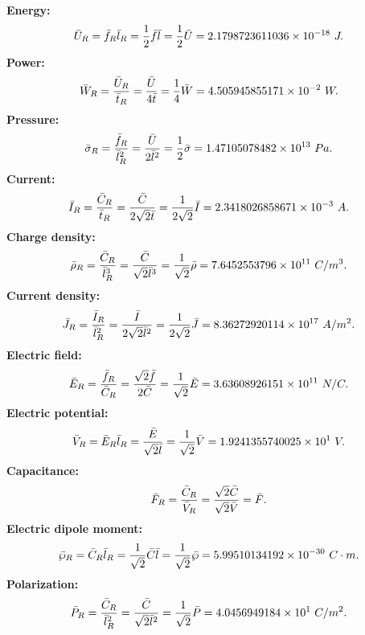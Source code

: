 \documentclass[12pt,a4paper]{article}
\def\barury{2.1798723611036\times 10^{-18}}
\def\barwry{4.505945855171\times 10^{-2}}
\def\barprry{1.47105078482\times 10^{13}}
\def\bariry{2.3418026858671\times 10^{-3}}
\def\barrhory{7.6452553796\times 10^{11}}
\def\barcurry{8.36272920114\times 10^{17}}
\def\barery{3.63608926151\times 10^{11}}
\def\barphiry{1.9241355740025\times 10^{1}}
\def\bardipry{5.99510134192\times 10^{-30}}
\def\barpolarry{4.0456949184\times 10^{1}}
\begin{document}
{{\bf Energy:}
\begin{equation}
\bar U_R={\bar f_R \bar l_R}= {1\over 2} \bar f \bar l
= {1\over 2} \bar U=\barury\ J.
\end{equation}
{\bf Power:}
\begin{equation}
\bar W_R={\bar U_R \over \bar t_R}= {\bar U \over 4 \bar t}
= {1\over 4} \bar W=\barwry\ W.
\end{equation}
{\bf Pressure:}
\begin{equation}
\bar \sigma_R={\bar f_R \over \bar l_R^2}= {\bar U \over 2 \bar l^2}
= {1\over 2} \bar \sigma=\barprry\ Pa.
\end{equation}
{\bf Current:}
\begin{equation}
\bar I_R={\bar C_R \over \bar t_R}= {\bar C \over 2 \sqrt{2} \bar t}
= {1\over 2 \sqrt{2}} \bar I=\bariry\ A.
\end{equation}
{\bf Charge density:}
\begin{equation}
\bar \rho_R={\bar C_R \over \bar l_R^3}= {\bar C \over \sqrt{2} \bar l^3}
= {1\over \sqrt{2}} \bar \rho=\barrhory\ C/m^3.
\end{equation}
{\bf Current density:}
\begin{equation}
\bar J_R={\bar I_R \over \bar l_R^2}= {\bar I \over 2 \sqrt{2} \bar l^2}
= {1\over 2 \sqrt{2}} \bar J=\barcurry\ A/m^2.
\end{equation}
{\bf Electric field:}
\begin{equation}
\bar E_R={\bar f_R \over \bar C_R}= {\sqrt{2}\bar f \over 2 \bar C}
= {1\over \sqrt{2}} \bar E=\barery\ N/C.
\end{equation}
{\bf Electric potential:}
\begin{equation}
\bar V_R={\bar E_R \bar l_R}= {\bar E \over \sqrt{2} \bar l}
= {1\over \sqrt{2}} \bar V=\barphiry\ V.
\end{equation}
{\bf Capacitance:}
\begin{equation}
\bar F_R={\bar C_R \over \bar V_R}= {\sqrt{2} \bar C \over \sqrt{2} \bar V}
= \bar F.
\end{equation}
{\bf Electric dipole moment:}
\begin{equation}
\bar \wp_R={\bar C_R \bar l_R}= {1\over \sqrt{2}} \bar C \bar l 
= {1\over \sqrt{2}} \bar \wp=\bardipry\ C\cdot m.
\end{equation}
{\bf Polarization:}
\begin{equation}
\bar P_R={\bar C_R \over \bar l_R^2}= {\bar C \over \sqrt{2} \bar l^2}
= {1\over \sqrt{2}} \bar P=\barpolarry\ C/m^2.
\end{equation}
}
\end{document}
